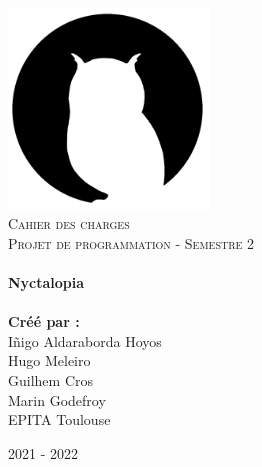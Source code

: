 \begin{titlepage}
    \vbox{ }

    \vbox{ }

    \begin{center}
        \includegraphics[width=0.40\textwidth]{img/logo.png}\\[1cm]
        \textsc{\Large Cahier des charges}\\[0.2cm]
        \textsc{\Large Projet de programmation - Semestre 2}\\[0.6cm]

        \noindent\makebox[\linewidth]{\rule{.7\paperwidth}{.6pt}}\\[0.7cm]
        { \huge \bfseries Nyctalopia}\\[0.25cm]
        \noindent\makebox[\linewidth]{\rule{.7\paperwidth}{.6pt}}\\[0.7cm]
        \large{\bfseries Créé par :}\\[0.1cm]
        \large{Iñigo Aldaraborda Hoyos}\\[0.1cm]
        \large{Hugo Meleiro}\\[0.1cm]
        \large{Guilhem Cros}\\[0.1cm]
        \large{Marin Godefroy}\\[0.1cm]
        \vfill
        \large
        EPITA Toulouse

            {\large 2021 - 2022}
    \end{center}
\end{titlepage}
